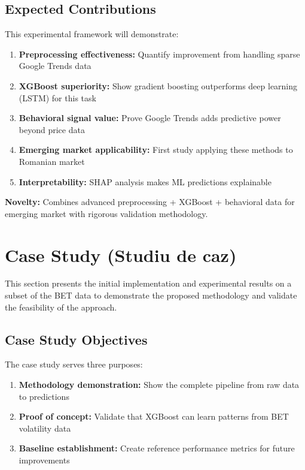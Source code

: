 \documentclass[12pt,a4paper]{article}
\begin{document}
\subsection{Expected Contributions}

This experimental framework will demonstrate:

\begin{enumerate}
    \item \textbf{Preprocessing effectiveness:} Quantify improvement from handling sparse Google Trends data
    
    \item \textbf{XGBoost superiority:} Show gradient boosting outperforms deep learning (LSTM) for this task
    
    \item \textbf{Behavioral signal value:} Prove Google Trends adds predictive power beyond price data
    
    \item \textbf{Emerging market applicability:} First study applying these methods to Romanian market
    
    \item \textbf{Interpretability:} SHAP analysis makes ML predictions explainable
\end{enumerate}

\textbf{Novelty:} Combines advanced preprocessing + XGBoost + behavioral data for emerging market with rigorous validation methodology.

\newpage
\section{Case Study (Studiu de caz)}

This section presents the initial implementation and experimental results on a subset of the BET data to demonstrate the proposed methodology and validate the feasibility of the approach.

\subsection{Case Study Objectives}

The case study serves three purposes:

\begin{enumerate}
    \item \textbf{Methodology demonstration:} Show the complete pipeline from raw data to predictions
    \item \textbf{Proof of concept:} Validate that XGBoost can learn patterns from BET volatility data
    \item \textbf{Baseline establishment:} Create reference performance metrics for future improvements
\end{enumerate}
\end{document}

